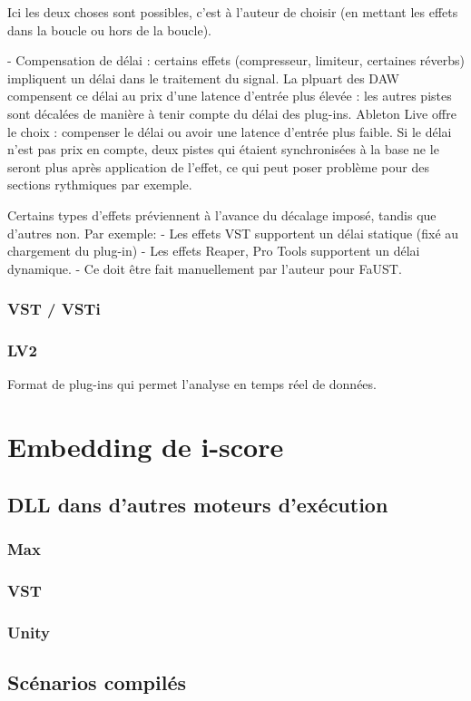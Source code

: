 \documentclass[french,a4paper]{book}
\begin{document}
Ici les deux choses sont possibles, c'est à l'auteur de choisir 
(en mettant les effets dans la boucle ou hors de la boucle).

- Compensation de délai : certains effets (compresseur, limiteur, certaines réverbs) impliquent 
un délai dans le traitement du signal.
La plpuart des DAW compensent ce délai au prix d'une latence d'entrée plus élevée : les autres 
pistes sont décalées de manière à tenir compte du délai des plug-ins.
Ableton Live offre le choix : compenser le délai ou avoir une latence d'entrée plus faible.
Si le délai n'est pas prix en compte, deux pistes qui étaient synchronisées à la base ne le seront plus 
après application de l'effet, ce qui peut poser problème pour des sections rythmiques par exemple.

Certains types d'effets préviennent à l'avance du décalage imposé, tandis que d'autres non.
Par exemple:
- Les effets VST supportent un délai statique (fixé au chargement du plug-in)
- Les effets Reaper, Pro Tools supportent un délai dynamique.
- Ce doit être fait manuellement par l'auteur pour FaUST.


\subsubsection{VST / VSTi}
\subsubsection{LV2}
Format de plug-ins qui permet l'analyse en temps réel de données.

\section{Embedding de i-score}
\subsection{DLL dans d'autres moteurs d'exécution}
\subsubsection{Max}
\subsubsection{VST}
\subsubsection{Unity}
\subsection{Scénarios compilés}
\end{document}
